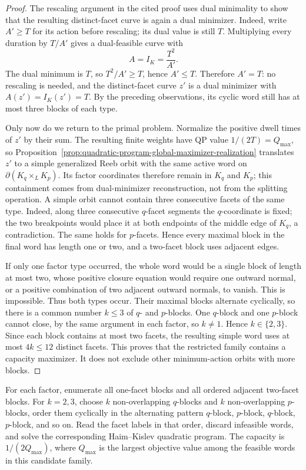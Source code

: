 \begin{proof}
The rescaling argument in the cited proof uses dual minimality to show that the
resulting distinct-facet curve is again a dual minimizer. Indeed, write
\(A'\geq T\) for its action before rescaling; its dual value is still \(T\).
Multiplying every duration by \(T/A'\) gives a dual-feasible curve with
\[
  A=I_K=\frac{T^2}{A'}.
\]
The dual minimum is \(T\), so \(T^2/A'\geq T\), hence \(A'\leq T\). Therefore
\(A'=T\): no rescaling is needed, and the distinct-facet curve \(z'\) is a
dual minimizer with \(A(z')=I_K(z')=T\). By the preceding observations, its
cyclic word still has at most three blocks of each type.

Only now do we return to the primal problem.  Normalize the positive dwell
times of \(z'\) by their sum. The resulting finite weights have QP value
\(1/(2T)=Q_{\max}\), so
Proposition~\ref{prop:quadratic-program-global-maximizer-realization} translates
\(z'\) to a simple generalized Reeb orbit with the same active word on
\(\partial(K_q\times_L K_p)\).  Its factor coordinates therefore remain in
\(K_q\) and \(K_p\); this containment comes from dual-minimizer reconstruction,
not from the splitting operation. A simple orbit cannot contain three
consecutive facets of the same type. Indeed, along
three consecutive \(q\)-facet segments the \(q\)-coordinate is fixed; the two
breakpoints would place it at both endpoints of the middle edge of \(K_q\), a
contradiction. The same holds for \(p\)-facets. Hence every maximal block in
the final word has length one or two, and a two-facet block uses adjacent
edges.

If only one factor type occurred, the whole word would be a single block of
length at most two, whose positive closure equation would require one outward
normal, or a positive combination of two adjacent outward normals, to vanish.
This is impossible. Thus both types occur. Their maximal blocks alternate
cyclically, so there is a common number \(k\leq3\) of \(q\)- and \(p\)-blocks.
One \(q\)-block and one \(p\)-block cannot close, by the same argument in each
factor, so \(k\neq1\). Hence \(k\in\{2,3\}\). Since each block contains at most
two facets, the resulting simple word uses at most \(4k\leq12\) distinct
facets. This proves that the restricted family contains a capacity maximizer.
It does not exclude other minimum-action orbits with more blocks.
\end{proof}

\begin{algorithm}
\label{alg:lagrangian-product-capacity-enumeration}
For each factor, enumerate all one-facet blocks and all ordered adjacent
two-facet blocks. For \(k=2,3\), choose \(k\) non-overlapping \(q\)-blocks and
\(k\) non-overlapping \(p\)-blocks, order them cyclically in the alternating
pattern $q$-block, $p$-block, $q$-block, $p$-block, and so on.
Read the facet labels in that order, discard infeasible words, and solve the
corresponding Haim--Kislev quadratic program. The capacity is
\(1/(2Q_{\max})\), where \(Q_{\max}\) is the largest objective value among the
feasible words in this candidate family.
\end{algorithm}

